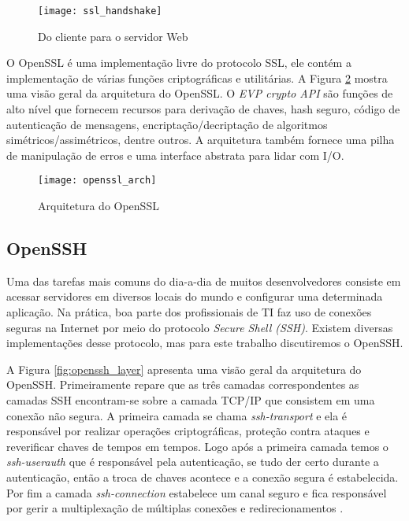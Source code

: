 \begin{figure}[!h]
  \centering
  \texttt{[image: ssl\_handshake]}
  \caption{Do cliente para o servidor Web}
  \label{fig:openssl_handshake}
\end{figure}

O OpenSSL é uma implementação livre do protocolo SSL, ele contém a
implementação de várias funções criptográficas e utilitárias. A Figura
\ref{fig:openssl_arch} mostra uma visão geral da arquitetura do OpenSSL. O
\textit{EVP crypto API} são funções de alto nível que fornecem recursos para
derivação de chaves, hash seguro, código de autenticação de mensagens,
encriptação/decriptação de algoritmos simétricos/assimétricos, dentre outros. A
arquitetura também fornece uma pilha de manipulação de erros e uma interface
abstrata para lidar com I/O.

\begin{figure}[!h]
  \centering
  \texttt{[image: openssl\_arch]}
  \caption[Arquitetura do OpenSSL]{Arquitetura do OpenSSL \citep{crypto_openssl}}
  \label{fig:openssl_arch}
\end{figure}

\subsection{OpenSSH}

Uma das tarefas mais comuns do dia-a-dia de muitos desenvolvedores consiste em
acessar servidores em diversos locais do mundo e configurar uma determinada
aplicação. Na prática, boa parte dos profissionais de TI faz uso de conexões
seguras na Internet por meio do protocolo \textit{Secure Shell (SSH)}. Existem
diversas implementações desse protocolo, mas para este trabalho discutiremos o
OpenSSH.

A Figura \ref{fig:openssh_layer} apresenta uma visão geral da arquitetura do
OpenSSH. Primeiramente repare que as três camadas correspondentes as camadas
SSH encontram-se sobre a camada TCP/IP que consistem em uma conexão não segura.
A primeira camada se chama \textit{ssh-transport} e ela é responsável por
realizar operações criptográficas, proteção contra ataques e reverificar chaves
de tempos em tempos. Logo após a primeira camada temos o \textit{ssh-userauth}
que é responsável pela autenticação, se tudo der certo durante a autenticação,
então a troca de chaves acontece e a conexão segura é estabelecida. Por fim a
camada \textit{ssh-connection} estabelece um canal seguro e fica responsável
por gerir a multiplexação de múltiplas conexões e redirecionamentos
\citep{proopenssh, opensshhood}.

